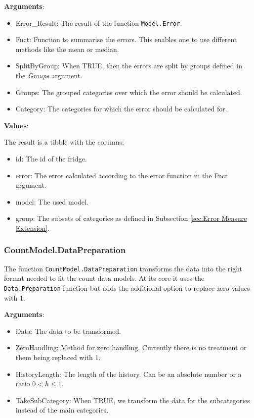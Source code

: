 \textbf{Arguments}:

\begin{itemize}
	\item Error\_Result: The result of the function \texttt{Model.Error}.
	\item Fnct: Function to summarise the errors. This enables one to use different methods like the mean or median. 
	\item SplitByGroup: When TRUE, then the errors are split by groups defined in the \textit{Groups} argument. 
	\item Groups: The grouped categories over which the error should be calculated. 
	\item Category: The categories for which the error should be calculated for.
\end{itemize}

\textbf{Values}:

The result is a tibble with the columns:
\begin{itemize}
	\item id: The id of the fridge. 
	\item error: The error calculated according to the error function in the Fnct argument. 
	\item model: The used model. 
	\item group: The subsets of categories as defined in Subsection \ref{sec:Error Measure Extension}.
\end{itemize}


\subsubsection{CountModel.DataPreparation}
\label{sec:CountModel.DataPreparation}

The function \texttt{CountModel.DataPreparation} transforms the data into the right format needed to fit the count data models. At its core it uses the \texttt{Data.Preparation} function but adds the additional option to replace zero values with 1. 

\textbf{Arguments}:

\begin{itemize}
	\item Data: The data to be transformed.
	\item ZeroHandling: Method for zero handling. Currently there is no treatment or them being replaced with 1. 
	\item HistoryLength: The length of the history. Can be an absolute number or a ratio $0<h\leq 1$. 
	\item TakeSubCategory: When TRUE, we transform the data for the subcategories instead of the main categories. 
\end{itemize}

